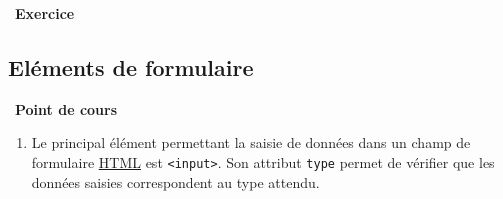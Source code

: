 \documentclass[
  11pt,
]{article}
\newcommand{\passthrough}[1]{#1}
\newcounter{exo}
\newenvironment{exercice}[1]
{\par \medskip   \addtocounter{exo}{1} \noindent  
\begin{bclogo}[arrondi =0.1,   noborder = true, logo=\bccrayon, marge=4]{~\textbf{Exercice} \textbf{\theexo} {\itshape #1} }  \par}
{
\end{bclogo}
 \par \bigskip }
\newcounter{def}
\newcounter{cours}
\newenvironment{cours}[1]
{\par \medskip   \addtocounter{cours}{1} \noindent  
\begin{bclogo}[arrondi =0.1,  ombre = true, barre=none, logo=\bcbook, marge=4]{~\textbf{Point de cours} \textbf{\thecours} {\itshape #1} }  \par}
{
\end{bclogo}
 \par \bigskip }
\begin{document}
\begin{exercice}{}
\end{exercice}

\hypertarget{eluxe9ments-de-formulaire}{%
\subsection{Eléments de formulaire}\label{eluxe9ments-de-formulaire}}

\begin{cours}{}

\begin{enumerate}
\def\labelenumi{\arabic{enumi}.}
\item
  Le principal élément permettant la saisie de données dans un champ de
  formulaire
  \href{https://developer.mozilla.org/fr/docs/Glossaire/HTML}{HTML} est
  \passthrough{\lstinline!<input>!}. Son attribut
  \passthrough{\lstinline!type!} permet de vérifier que les données
  saisies correspondent au type attendu.


\end{enumerate}
\end{cours}
\end{document}
